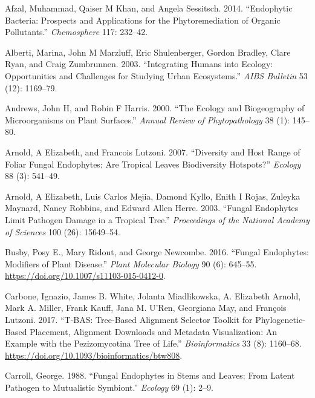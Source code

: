 \documentclass[fleqn,10pt,lineno]{wlpeerj} %
\newlength{\cslhangindent}
\newenvironment{CSLReferences}[2] %
 {%
  \setlength{\parindent}{0pt}
  \ifodd #1 \everypar{\setlength{\hangindent}{\cslhangindent}}\ignorespaces\fi
  \ifnum #2 > 0
  \setlength{\parskip}{#2\baselineskip}
  \fi
 }%
 {}
\begin{document}
\hypertarget{refs}{}
\begin{CSLReferences}{1}{0}
\leavevmode{}%
Afzal, Muhammad, Qaiser M Khan, and Angela Sessitsch. 2014. {``Endophytic Bacteria: Prospects and Applications for the Phytoremediation of Organic Pollutants.''} \emph{Chemosphere} 117: 232--42.

\leavevmode{}%
Alberti, Marina, John M Marzluff, Eric Shulenberger, Gordon Bradley, Clare Ryan, and Craig Zumbrunnen. 2003. {``Integrating Humans into Ecology: Opportunities and Challenges for Studying Urban Ecosystems.''} \emph{AIBS Bulletin} 53 (12): 1169--79.

\leavevmode{}%
Andrews, John H, and Robin F Harris. 2000. {``The Ecology and Biogeography of Microorganisms on Plant Surfaces.''} \emph{Annual Review of Phytopathology} 38 (1): 145--80.

\leavevmode{}%
Arnold, A Elizabeth, and Francois Lutzoni. 2007. {``Diversity and Host Range of Foliar Fungal Endophytes: Are Tropical Leaves Biodiversity Hotspots?''} \emph{Ecology} 88 (3): 541--49.

\leavevmode{}%
Arnold, A Elizabeth, Luis Carlos Mejia, Damond Kyllo, Enith I Rojas, Zuleyka Maynard, Nancy Robbins, and Edward Allen Herre. 2003. {``Fungal Endophytes Limit Pathogen Damage in a Tropical Tree.''} \emph{Proceedings of the National Academy of Sciences} 100 (26): 15649--54.

\leavevmode{}%
Busby, Posy E., Mary Ridout, and George Newcombe. 2016. {``Fungal Endophytes: Modifiers of Plant Disease.''} \emph{Plant Molecular Biology} 90 (6): 645--55. \url{https://doi.org/10.1007/s11103-015-0412-0}.

\leavevmode{}%
Carbone, Ignazio, James B. White, Jolanta Miadlikowska, A. Elizabeth Arnold, Mark A. Miller, Frank Kauff, Jana M. U'Ren, Georgiana May, and François Lutzoni. 2017. {``T-BAS: Tree-Based Alignment Selector Toolkit for Phylogenetic-Based Placement, Alignment Downloads and Metadata Visualization: An Example with the Pezizomycotina Tree of Life.''} \emph{Bioinformatics} 33 (8): 1160--68. \url{https://doi.org/10.1093/bioinformatics/btw808}.

\leavevmode{}%
Carroll, George. 1988. {``Fungal Endophytes in Stems and Leaves: From Latent Pathogen to Mutualistic Symbiont.''} \emph{Ecology} 69 (1): 2--9.


\end{CSLReferences}
\end{document}
